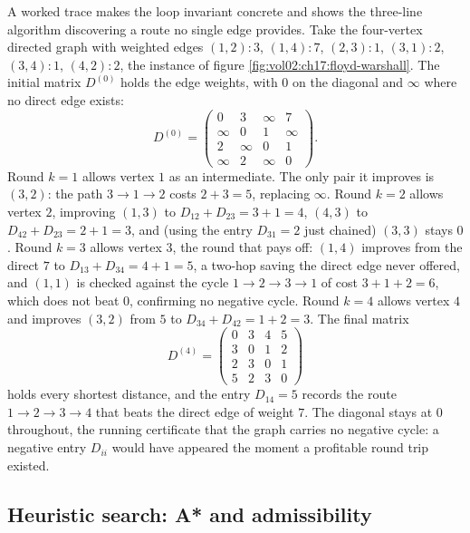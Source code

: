 A worked trace makes the loop invariant concrete and shows the
three-line algorithm discovering a route no single edge provides.
Take the four-vertex directed graph with weighted edges $(1, 2){:}3$,
$(1, 4){:}7$, $(2, 3){:}1$, $(3, 1){:}2$, $(3, 4){:}1$, $(4, 2){:}2$,
the instance of figure \ref{fig:vol02:ch17:floyd-warshall}. The
initial matrix $D^{(0)}$ holds the edge weights, with $0$ on the
diagonal and $\infty$ where no direct edge exists:
\[
D^{(0)} = \begin{pmatrix}
0 & 3 & \infty & 7 \\
\infty & 0 & 1 & \infty \\
2 & \infty & 0 & 1 \\
\infty & 2 & \infty & 0
\end{pmatrix}.
\]
Round $k = 1$ allows vertex $1$ as an intermediate. The only pair it
improves is $(3, 2)$: the path $3 \to 1 \to 2$ costs $2 + 3 = 5$,
replacing $\infty$. Round $k = 2$ allows vertex $2$, improving
$(1, 3)$ to $D_{12} + D_{23} = 3 + 1 = 4$, $(4, 3)$ to $D_{42} +
D_{23} = 2 + 1 = 3$, and (using the entry $D_{31} = 2$ just chained)
$(3, 3)$ stays $0$. Round $k = 3$ allows vertex $3$, the round that
pays off: $(1, 4)$ improves from the direct $7$ to $D_{13} + D_{34}
= 4 + 1 = 5$, a two-hop saving the direct edge never offered, and
$(1, 1)$ is checked against the cycle $1 \to 2 \to 3 \to 1$ of cost
$3 + 1 + 2 = 6$, which does not beat $0$, confirming no negative
cycle. Round $k = 4$ allows vertex $4$ and improves $(3, 2)$ from
$5$ to $D_{34} + D_{42} = 1 + 2 = 3$. The final matrix
\[
D^{(4)} = \begin{pmatrix}
0 & 3 & 4 & 5 \\
3 & 0 & 1 & 2 \\
2 & 3 & 0 & 1 \\
5 & 2 & 3 & 0
\end{pmatrix}
\]
holds every shortest distance, and the entry $D_{14} = 5$ records
the route $1 \to 2 \to 3 \to 4$ that beats the direct edge of weight
$7$. The diagonal stays at $0$ throughout, the running certificate
that the graph carries no negative cycle: a negative entry $D_{ii}$
would have appeared the moment a profitable round trip existed.



\subsection{Heuristic search: A* and admissibility}


